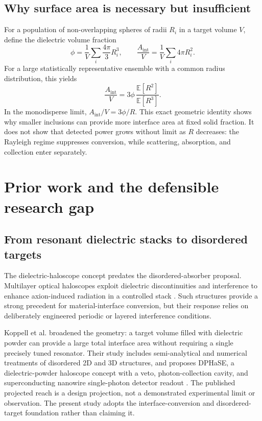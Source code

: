 \documentclass[10.5pt,a4paper]{article}
\begin{document}
\subsection{Why surface area is necessary but insufficient}
For a population of non-overlapping spheres of radii $R_i$ in a target volume $V$, define the dielectric volume fraction
\begin{equation}
\phi = \frac{1}{V}\sum_i \frac{4\pi}{3}R_i^3,
\qquad
\frac{A_{\mathrm{int}}}{V}=\frac{1}{V}\sum_i4\pi R_i^2.
\label{eq:surface}
\end{equation}
For a large statistically representative ensemble with a common radius distribution, this yields
\begin{equation}
\boxed{\frac{A_{\mathrm{int}}}{V}=3\phi\,\frac{\mathbb E[R^2]}{\mathbb E[R^3]}.}
\label{eq:polydispersearea}
\end{equation}
In the monodisperse limit, $A_{\mathrm{int}}/V=3\phi/R$. This exact geometric identity shows why smaller inclusions can provide more interface area at fixed solid fraction. It does not show that detected power grows without limit as $R$ decreases: the Rayleigh regime suppresses conversion, while scattering, absorption, and collection enter separately.

\section{Prior work and the defensible research gap}
\subsection{From resonant dielectric stacks to disordered targets}
The dielectric-haloscope concept predates the disordered-absorber proposal. Multilayer optical haloscopes exploit dielectric discontinuities and interference to enhance axion-induced radiation in a controlled stack \parencite{MADMAX2017,Baryakhtar2018}. Such structures provide a strong precedent for material-interface conversion, but their response relies on deliberately engineered periodic or layered interference conditions.

Koppell et al. broadened the geometry: a target volume filled with dielectric powder can provide a large total interface area without requiring a single precisely tuned resonator. Their study includes semi-analytical and numerical treatments of disordered 2D and 3D structures, and proposes DPHaSE, a dielectric-powder haloscope concept with a veto, photon-collection cavity, and superconducting nanowire single-photon detector readout \parencite{Koppell2026}. The published projected reach is a design projection, not a demonstrated experimental limit or observation. The present study adopts the interface-conversion and disordered-target foundation rather than claiming it.
\end{document}
